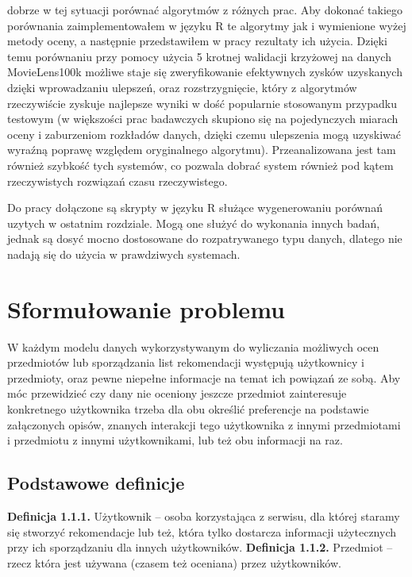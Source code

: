 \documentclass{pracamgr}
\begin{document}
  dobrze w tej sytuacji porównać algorytmów z różnych prac.
  Aby dokonać takiego porównania zaimplementowałem w języku R te algorytmy jak i wymienione wyżej metody oceny,
  a następnie przedstawiłem w pracy rezultaty ich użycia.
  Dzięki temu porównaniu przy pomocy użycia 5 krotnej walidacji krzyżowej na danych
  MovieLens100k \cite{ML} możliwe staje się zweryfikowanie efektywnych zysków uzyskanych dzięki wprowadzaniu ulepszeń,
  oraz rozstrzygnięcie, który z algorytmów rzeczywiście zyskuje najlepsze wyniki w dość popularnie stosowanym przypadku testowym
  (w większości prac badawczych skupiono się na pojedynczych miarach oceny i zaburzeniom rozkładów danych,
  dzięki czemu ulepszenia mogą uzyskiwać wyraźną poprawę względem oryginalnego algorytmu).
  Przeanalizowana jest tam również szybkość tych systemów, co pozwala dobrać system również pod kątem rzeczywistych rozwiązań czasu rzeczywistego.\newline
  
  Do pracy dołączone są skrypty w języku R służące wygenerowaniu porównań uzytych w ostatnim rozdziale.
  Mogą one służyć do wykonania innych badań, jednak są dosyć mocno dostosowane do rozpatrywanego typu danych, dlatego nie nadają się do
  użycia w prawdziwych systemach.
  
 \chapter{Sformułowanie problemu}
  W każdym modelu danych wykorzystywanym do wyliczania możliwych ocen przedmiotów lub sporządzania list rekomendacji
  występują użytkownicy i przedmioty, oraz pewne niepełne informacje na temat ich powiązań ze sobą.
  Aby móc przewidzieć czy dany nie oceniony jeszcze przedmiot zainteresuje konkretnego użytkownika trzeba dla obu określić preferencje na podstawie 
  załączonych opisów, znanych interakcji tego użytkownika z innymi przedmiotami i przedmiotu z innymi użytkownikami, lub też obu informacji na raz.
  
  \section{Podstawowe definicje}
   \textbf{Definicja 1.1.1.} Użytkownik -- osoba korzystająca z serwisu, dla której staramy się stworzyć rekomendacje lub też,
    która tylko dostarcza informacji użytecznych przy ich sporządzaniu dla innych użytkowników.\newline\newline
   \textbf{Definicja 1.1.2.} Przedmiot -- rzecz która jest używana (czasem też oceniana) przez użytkowników.\newline
   
\end{document}
